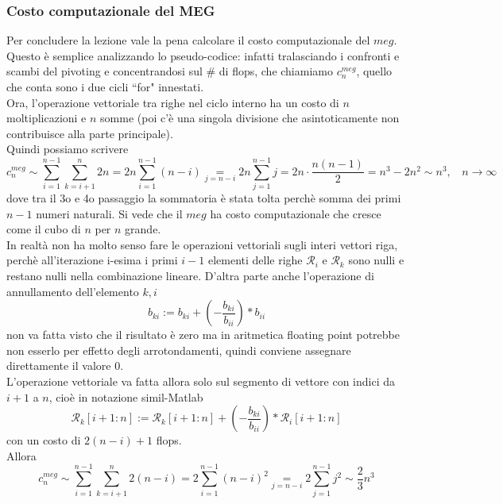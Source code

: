 \subsubsection{Costo computazionale del MEG}
Per concludere la lezione vale la pena calcolare il costo computazionale del $meg$.\\Questo è semplice analizzando lo pseudo-codice: infatti tralasciando i confronti e scambi del pivoting e concentrandosi sul \# di flops, che chiamiamo $c_n^{meg}$, quello che conta sono i due cicli ``for" innestati.\\Ora, l'operazione vettoriale tra righe nel ciclo interno ha un costo di $n$ moltiplicazioni e $n$ somme (poi c'è una singola divisione che asintoticamente non contribuisce alla parte principale).\\Quindi possiamo scrivere
\begin{equation*}
    c_n^{meg}\sim\sum_{i=1}^{n-1}\sum_{k=i+1}^{n}2n=2n\sum_{i=1}^{n-1}(n-i)\underset{j=n-i}{=}2n\sum_{j=1}^{n-1}j=2n\cdot\frac{n(n-1)}{2}=n^3-2n^2\sim n^3,\  \  \  \  n\rightarrow\infty
\end{equation*}
dove tra il 3o e 4o passaggio la sommatoria è stata tolta perchè somma dei primi $n-1$ numeri naturali. Si vede che il $meg$ ha costo computazionale che cresce come il cubo di $n$ per $n$ grande.\\In realtà non ha molto senso fare le operazioni vettoriali sugli interi vettori riga, perchè all'iterazione i-esima i primi $i-1$ elementi delle righe $\mathcal{R}_i$ e $\mathcal{R}_k$ sono nulli e restano nulli nella combinazione lineare. D'altra parte anche l'operazione di annullamento dell'elemento $k,i$
\begin{equation*}
    b_{ki}:=b_{ki}+(-\frac{b_{ki}}{b_{ii}})\ast b_{ii}
\end{equation*}
non va fatta visto che il risultato è zero ma in aritmetica floating point potrebbe non esserlo per effetto degli arrotondamenti, quindi conviene assegnare direttamente il valore 0.\\L'operazione vettoriale va fatta allora solo sul segmento di vettore con indici da $i+1$ a $n$, cioè in notazione simil-Matlab
\begin{equation*}
    \mathcal{R}_k[i+1:n]:=\mathcal{R}_k[i+1:n]+(-\frac{b_{ki}}{b_{ii}})\ast \mathcal{R}_i[i+1:n]
\end{equation*}
con un costo di $2(n-i)+1$ flops.\\Allora
\begin{equation*}
    c_n^{meg}\sim\sum_{i=1}^{n-1}\sum_{k=i+1}^{n}2(n-i)=2\sum_{i=1}^{n-1}(n-i)^2\underset{j=n-i}{=}2\sum_{j=1}^{n-1}j^2\sim \frac{2}{3}n^3
\end{equation*}
